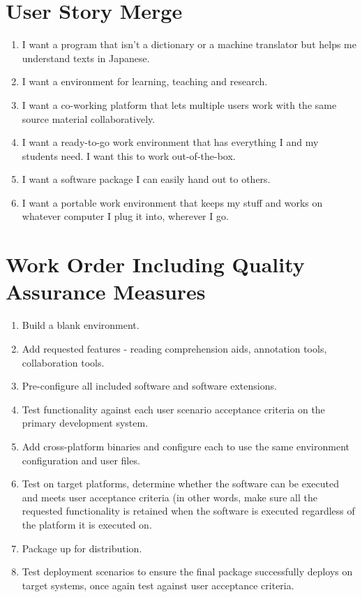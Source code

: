 \documentclass{article}
\begin{document}
\section{User Story Merge}
\begin{enumerate}
    \item I want a program that isn't a dictionary or a machine translator but helps me understand texts in Japanese.
    \item I want a environment for learning, teaching and research.
    \item I want a co-working platform that lets multiple users work with the same source material collaboratively.
    \item I want a ready-to-go work environment that has everything I and my students need. I want this to work out-of-the-box.
    \item I want a software package I can easily hand out to others.
    \item I want a portable work environment that keeps my stuff and works on whatever computer I plug it into, wherever I go.
\end{enumerate}

\section{Work Order Including Quality Assurance Measures}
\begin{enumerate}
    \item Build a blank environment.
    \item Add requested features - reading comprehension aids, annotation tools, collaboration tools.
    \item Pre-configure all included software and software extensions.
    \item Test functionality against each user scenario acceptance criteria on the primary development system.
    \item Add cross-platform binaries and configure each to use the same environment configuration and user files.
    \item Test on target platforms, determine whether the software can be executed and meets user acceptance criteria (in other words, make sure all the requested functionality is retained when the software is executed regardless of the platform it is executed on.
    \item Package up for distribution.
    \item Test deployment scenarios to ensure the final package successfully deploys on target systems, once again test against user acceptance criteria.
\end{enumerate}
\end{document}
